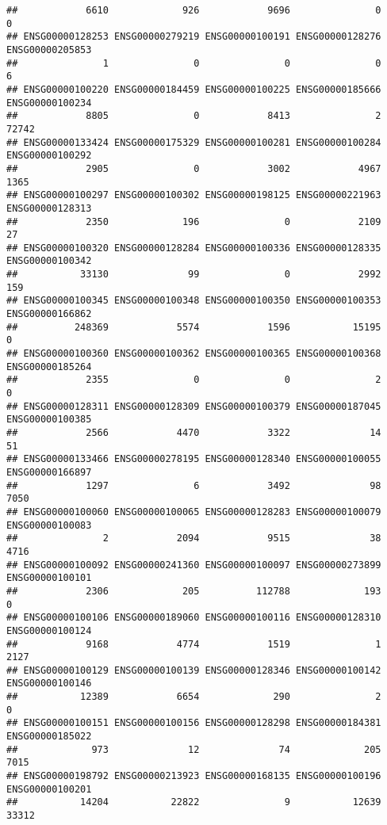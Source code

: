 \documentclass[
]{article}
\begin{document}
\begin{verbatim}
##            6610             926            9696               0               0 
## ENSG00000128253 ENSG00000279219 ENSG00000100191 ENSG00000128276 ENSG00000205853 
##               1               0               0               0               6 
## ENSG00000100220 ENSG00000184459 ENSG00000100225 ENSG00000185666 ENSG00000100234 
##            8805               0            8413               2           72742 
## ENSG00000133424 ENSG00000175329 ENSG00000100281 ENSG00000100284 ENSG00000100292 
##            2905               0            3002            4967            1365 
## ENSG00000100297 ENSG00000100302 ENSG00000198125 ENSG00000221963 ENSG00000128313 
##            2350             196               0            2109              27 
## ENSG00000100320 ENSG00000128284 ENSG00000100336 ENSG00000128335 ENSG00000100342 
##           33130              99               0            2992             159 
## ENSG00000100345 ENSG00000100348 ENSG00000100350 ENSG00000100353 ENSG00000166862 
##          248369            5574            1596           15195               0 
## ENSG00000100360 ENSG00000100362 ENSG00000100365 ENSG00000100368 ENSG00000185264 
##            2355               0               0               2               0 
## ENSG00000128311 ENSG00000128309 ENSG00000100379 ENSG00000187045 ENSG00000100385 
##            2566            4470            3322              14              51 
## ENSG00000133466 ENSG00000278195 ENSG00000128340 ENSG00000100055 ENSG00000166897 
##            1297               6            3492              98            7050 
## ENSG00000100060 ENSG00000100065 ENSG00000128283 ENSG00000100079 ENSG00000100083 
##               2            2094            9515              38            4716 
## ENSG00000100092 ENSG00000241360 ENSG00000100097 ENSG00000273899 ENSG00000100101 
##            2306             205          112788             193               0 
## ENSG00000100106 ENSG00000189060 ENSG00000100116 ENSG00000128310 ENSG00000100124 
##            9168            4774            1519               1            2127 
## ENSG00000100129 ENSG00000100139 ENSG00000128346 ENSG00000100142 ENSG00000100146 
##           12389            6654             290               2               0 
## ENSG00000100151 ENSG00000100156 ENSG00000128298 ENSG00000184381 ENSG00000185022 
##             973              12              74             205            7015 
## ENSG00000198792 ENSG00000213923 ENSG00000168135 ENSG00000100196 ENSG00000100201 
##           14204           22822               9           12639           33312 

\end{verbatim}
\end{document}
